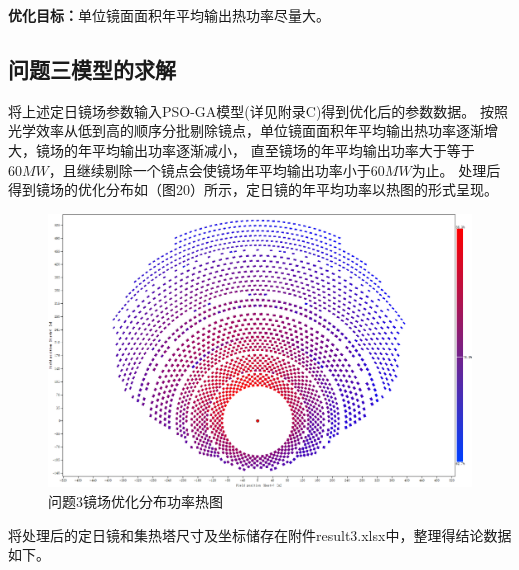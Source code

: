 \documentclass{article}
\numberwithin{equation}{subsection}
\begin{document}
\textbf{优化目标：}单位镜面面积年平均输出热功率尽量大。

\subsection{问题三模型的求解}

将上述定日镜场参数输入PSO-GA模型(详见附录C)得到优化后的参数数据。
按照光学效率从低到高的顺序分批剔除镜点，单位镜面面积年平均输出热功率逐渐增大，镜场的年平均输出功率逐渐减小，
直至镜场的年平均输出功率大于等于$60MW$，且继续剔除一个镜点会使镜场年平均输出功率小于$60MW$为止。
处理后得到镜场的优化分布如（图20）所示，定日镜的年平均功率以热图的形式呈现。

\begin{figure}[H]
    \centering
    \includegraphics[scale=0.23]{问题3-2镜场优化分布功率热图.png}
    \caption{问题3镜场优化分布功率热图}
\end{figure}

将处理后的定日镜和集热塔尺寸及坐标储存在附件result3.xlsx中，整理得结论数据如下。
\end{document}
